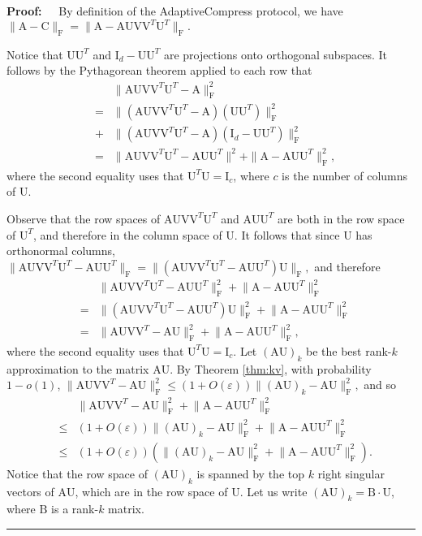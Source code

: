 \documentclass[11pt]{article}
\newcommand{\FNorm }[1]{\mbox{}\|#1\|_\mathrm{F}  }
\newcommand{\FNormS}[1]{\mbox{}\|#1\|_\mathrm{F}^2}
\newenvironment{proof}{\begin{trivlist} \item {\bf Proof:~~}}
  {\qed\end{trivlist}}
\newcommand{\mat}[1]{{\ensuremath{\bm{\mathrm{#1}}}}}
\def\matA{\mat{A}}
\def\matB{\mat{B}}
\def\matC{\mat{C}}
\def\matI{\mat{I}}
\def\matU{\mat{U}}
\def\matV{\mat{V}}
\def\qed{\hfill\rule{2mm}{2mm}}
\newcommand{\eps}{\varepsilon}
\begin{document}
\begin{proof}
By definition of the {\sc AdaptiveCompress} protocol, we have 
$\FNorm{\matA-\matC} = \FNorm{\matA- \matA\matU \matV \matV^T \matU^T}.$

Notice
that $\matU\matU^T$ and $\matI_{d}-\matU\matU^T$ are projections onto orthogonal subspaces. 
It follows by the Pythagorean theorem applied to each row that
\begin{eqnarray}\label{eqn:first}
&& \FNormS{\matA\matU \matV \matV^T \matU^T - \matA} \nonumber \\
& = & \FNormS{(\matA\matU \matV \matV^T \matU^T -\matA)(\matU \matU^T)}\\ 
& +&  \FNormS{(\matA\matU \matV \matV^T \matU^T-\matA)(\matI_d - \matU\matU^T)}\nonumber \\
& = & \FNormS{\matA\matU\matV\matV^T\matU^T - \matA\matU\matU^T\|^2 + \|\matA-\matA\matU\matU^T},
\end{eqnarray}
where the second equality uses that $\matU^T\matU = \matI_c$, where $c$ is the number of columns of $\matU$.

Observe that the row spaces of $\matA\matU\matV\matV^T\matU^T$ and $\matA\matU\matU^T$ are both in the row space of $\matU^T$, and
therefore in the column space of $\matU$. It follows that since $\matU$ has orthonormal columns,
$\FNorm{\matA\matU\matV\matV^T\matU^T-\matA\matU\matU^T} = \FNorm{(\matA\matU\matV\matV^T\matU^T-\matA\matU\matU^T)\matU},$ 
and therefore
\begin{eqnarray}\label{eqn:second}
&& \FNormS{\matA\matU\matV\matV^T\matU^T-\matA\matU\matU^T} + \FNormS{\matA-\matA\matU\matU^T} \nonumber \\ 
& = & \FNormS{(\matA\matU\matV\matV^T\matU^T-\matA\matU\matU^T)\matU} + 
\FNormS{\matA-\matA\matU\matU^T} \nonumber \\
& = & \FNormS{\matA\matU\matV\matV^T - \matA\matU} + \FNormS{\matA-\matA\matU\matU^T},
\end{eqnarray}
where the second equality uses that $\matU^T \matU = \matI_c$. Let $(\matA\matU)_k$ be the best rank-$k$ approximation to
the matrix $\matA\matU$. By Theorem \ref{thm:kv}, with probability $1-o(1)$,
$\FNormS{\matA\matU\matV\matV^T - \matA\matU} \leq (1+O(\eps)) \FNormS{(\matA\matU)_k - \matA\matU},$
and so
\begin{eqnarray}\label{eqn:third}
&& \FNormS{\matA\matU\matV\matV^T-\matA\matU} + \FNormS{\matA-\matA\matU\matU^T}\nonumber \\
& \leq & (1+O(\eps)) \FNormS{(\matA\matU)_k - \matA\matU} +  \FNormS{\matA-\matA\matU\matU^T} \nonumber \\
& \leq & (1+O(\eps)) ( \FNormS{(\matA\matU)_k - \matA\matU} +  \FNormS{\matA-\matA\matU\matU^T}).
\end{eqnarray}
Notice that the row space of $(\matA\matU)_k$ is spanned by the top $k$ right singular
vectors of $\matA\matU$, which are in the row space of $\matU$. Let us write $(\matA\matU)_k = \matB \cdot \matU$, 
where $\matB$ is a rank-$k$ matrix.


\end{proof}
\end{document}
